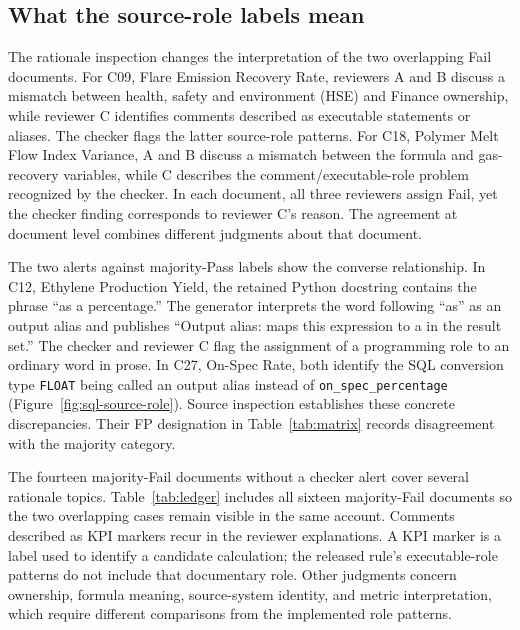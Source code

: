 \documentclass[a4paper,fleqn]{cas-dc}
\begin{document}
\subsection{What the source-role labels mean}
\label{sec:rationales}
The rationale inspection changes the interpretation of the two overlapping Fail documents. For C09, Flare Emission Recovery Rate, reviewers A and B discuss a mismatch between health, safety and environment (HSE) and Finance ownership, while reviewer C identifies comments described as executable statements or aliases. The checker flags the latter source-role patterns. For C18, Polymer Melt Flow Index Variance, A and B discuss a mismatch between the formula and gas-recovery variables, while C describes the comment/executable-role problem recognized by the checker. In each document, all three reviewers assign Fail, yet the checker finding corresponds to reviewer C's reason. The agreement at document level combines different judgments about that document.

The two alerts against majority-Pass labels show the converse relationship. In C12, Ethylene Production Yield, the retained Python docstring contains the phrase ``as a percentage.'' The generator interprets the word following ``as'' as an output alias and publishes ``Output alias: maps this expression to a in the result set.'' The checker and reviewer C flag the assignment of a programming role to an ordinary word in prose. In C27, On-Spec Rate, both identify the SQL conversion type \texttt{FLOAT} being called an output alias instead of \texttt{on\_spec\_percentage} (Figure~\ref{fig:sql-source-role}). Source inspection establishes these concrete discrepancies. Their FP designation in Table~\ref{tab:matrix} records disagreement with the majority category.

The fourteen majority-Fail documents without a checker alert cover several rationale topics. Table~\ref{tab:ledger} includes all sixteen majority-Fail documents so the two overlapping cases remain visible in the same account. Comments described as KPI markers recur in the reviewer explanations. A KPI marker is a label used to identify a candidate calculation; the released rule's executable-role patterns do not include that documentary role. Other judgments concern ownership, formula meaning, source-system identity, and metric interpretation, which require different comparisons from the implemented role patterns.
\end{document}
